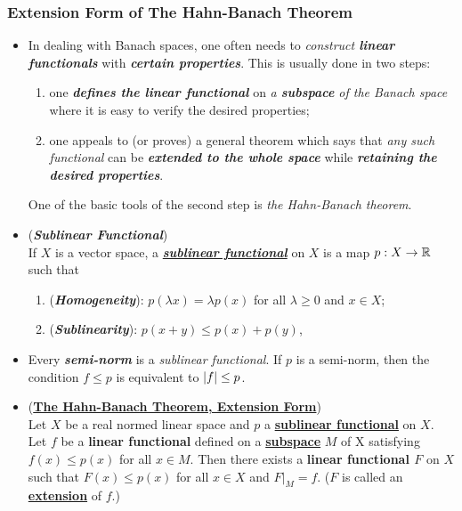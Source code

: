 \documentclass[11pt]{article}
\begin{document}
\subsubsection{Extension Form of The Hahn-Banach Theorem}
\begin{itemize}
\item  \begin{remark}
In dealing with Banach spaces, one often needs to \emph{construct \textbf{linear functionals}} with \emph{\textbf{certain properties}}. This is usually done in two steps:
\begin{enumerate}
\item one \emph{\textbf{defines the linear functional}} on \emph{a \textbf{subspace} of the Banach space} where it is easy to verify the desired properties;
\item one appeals to (or proves) a general theorem which says that \emph{any such functional} can be \emph{\textbf{extended to the whole space}} while \emph{\textbf{retaining the desired properties}}.
\end{enumerate}
One of the basic tools of the second step is \emph{the Hahn-Banach theorem}.
\end{remark}

\item \begin{definition} (\emph{\textbf{Sublinear Functional}})\\
If $X$ is a vector space, a \underline{\emph{\textbf{sublinear functional}}} on $X$ is a map $p: X \rightarrow {\mathbb R}$ such that 
\begin{enumerate}
\item (\emph{\textbf{Homogeneity}}): $p(\lambda x) = \lambda p(x)$ for all $\lambda \ge 0$ and $x \in X$;
\item (\emph{\textbf{Sublinearity}}): $p(x + y) \le p(x) + p(y)$,
\end{enumerate}
\end{definition}

\item \begin{example}
Every \emph{\textbf{semi-norm}} is a \emph{sublinear functional}. If $p$ is a semi-norm, then the condition $f \le p$ is equivalent to $\left\lvert f \right\rvert \le p$.
\end{example}

\item \begin{theorem} (\underline{\textbf{The Hahn-Banach Theorem, Extension Form}}) \citep{kreyszig1989introductory, reed1980methods, luenberger1997optimization, folland2013real}\\
Let $X$ be a real normed linear space and $p$ a \underline{\textbf{sublinear functional}} on $X$. Let $f$ be a \textbf{linear functional} defined on a \underline{\textbf{subspace}} $M$ of X satisfying $f(x) \le p(x)$ for all $x \in M$. Then there exists a \textbf{linear functional $F$} on $X$ such that $F(x) \le p(x)$  for all $x \in X$ and $F|_{M} = f$. ($F$ is called an \underline{\textbf{extension}} of $f$.) 
\end{theorem}



\end{itemize}
\end{document}
